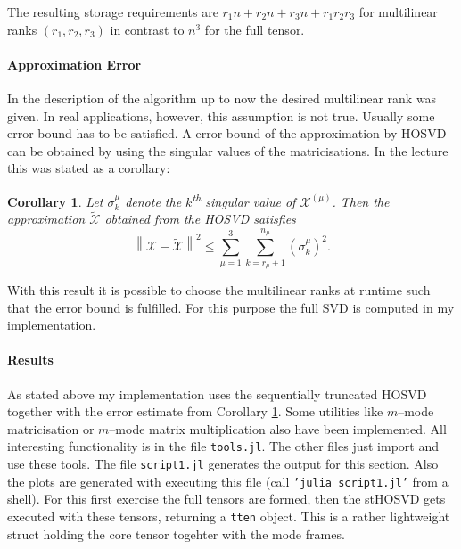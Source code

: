 \documentclass[%
a4paper,
parskip=half,
DIV=calc,
]
{scrartcl}
\newtheorem{corollary}[theorem]{Corollary}
\begin{document}
The resulting storage requirements are
$r_1 n + r_2 n + r_3 n + r_1 r_2 r_3$ for multilinear ranks
$(r_1, r_2, r_3)$ in contrast to $n^3$ for the full tensor.

\paragraph{Approximation Error}

In the description of the algorithm up to now the desired multilinear
rank was given.  In real applications, however, this assumption is not
true.  Usually some error bound has to be satisfied.  A error bound of
the approximation by HOSVD can be obtained by using the singular
values of the matricisations.  In the lecture this was stated as a corollary:
\begin{corollary}
  \label{cor:err}
  Let $\sigma_k^{\mu}$ denote the $k$\textsuperscript{th} singular
  value of $\mathcal{X}^{(\mu)}$.  Then the approximation
  $\tilde{\mathcal{X}}$ obtained from the HOSVD satisfies
  \begin{equation*}
    \left\| \mathcal{X} - \tilde{\mathcal{X}} \right\|^2 \leq \sum_{\mu = 1}^3 \sum_{k = r_\mu + 1}^{n_\mu}
    \left( \sigma_k^\mu \right)^2.
  \end{equation*}
\end{corollary}
With this result it is possible to choose the multilinear ranks at
runtime such that the error bound is fulfilled.  For this purpose the
full SVD is computed in my implementation.

\paragraph{Results}

As stated above my implementation uses the sequentially truncated
HOSVD together with the error estimate from Corollary \ref{cor:err}.
Some utilities like $m$--mode matricisation or $m$--mode matrix
multiplication also have been implemented. All interesting
functionality is in the file \texttt{tools.jl}.  The other files just
import and use these tools.  The file \texttt{script1.jl} generates
the output for this section. Also the plots are generated with
executing this file (call \texttt{'julia script1.jl'} from a shell).
For this first exercise the full tensors are formed, then the stHOSVD
gets executed with these tensors, returning a \texttt{tten}
object. This is a rather lightweight struct holding the core tensor
togehter with the mode frames.
\end{document}

